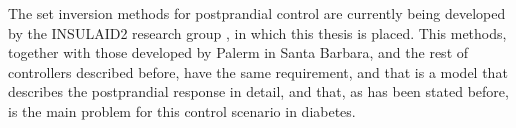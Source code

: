 The set inversion methods for postprandial control are currently being developed by the INSULAID2 research group \cite{insulaid}, in which this thesis is placed. This methods, together with those developed by Palerm in Santa Barbara, and the rest of controllers described before, have the same requirement, and that is a model that describes the postprandial response in detail, and that, as has been stated before, is the main problem for this control scenario in diabetes.
